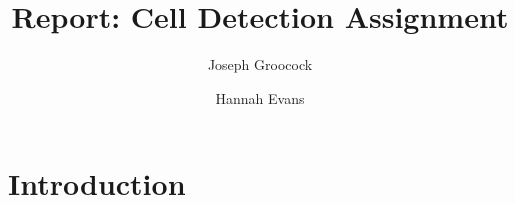 \documentclass{article}
\title {Report: Cell Detection Assignment}
\author {Joseph Groocock \and Hannah Evans}
\begin{document}
    \maketitle
    \section{Introduction}
\end{document}
